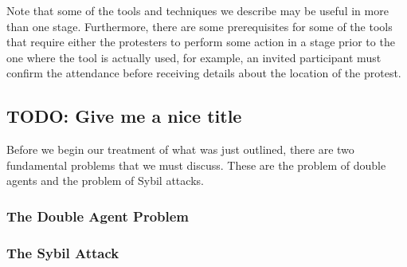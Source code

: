 Note that some of the tools and techniques we describe may be useful in more than 
one stage. Furthermore, there are some prerequisites for some of the tools that 
require either the protesters to perform some action in a stage prior to the one 
where the tool is actually used, for example, an invited participant must confirm 
the attendance before receiving details about the location of the protest.

\subsection{TODO: Give me a nice title}
Before we begin our treatment of what was just outlined, there are two 
fundamental problems that we must discuss.
These are the problem of double agents and the problem of Sybil attacks.

\subsubsection{The Double Agent Problem}
\label{DoubleAgentProblem}



\subsubsection{The Sybil Attack}
\label{SybilAttacks}



